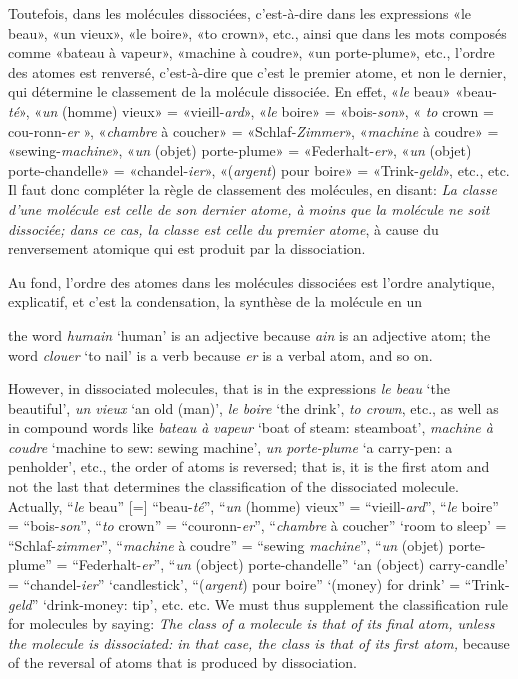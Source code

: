 \begin{sloppypar}
{    Toutefois, dans les molécules dissociées, c'est-à-dire dans les
    expressions «le beau», «un vieux», «le boire», «to crown», etc.,
    ainsi que dans les mots composés comme «bateau à vapeur», «machine
    à coudre», «un porte-plume», etc., l’ordre des atomes est
    renversé, c’est-à-dire que c’est le premier atome, et non le
    dernier, qui détermine le classement de la molécule dissociée. En
    effet, «\emph{le} beau» «beau-\emph{té}», «\emph{un} (homme)
    vieux» = «vieill-\emph{ard}», «\emph{le} boire» =
    «bois-\emph{son}», « \emph{to} crown = cou-ronn-\emph{er} »,
    «\emph{chambre} à coucher» = «Schlaf-\emph{Zimmer}»,
    «\emph{machine} à coudre» = «sewing-\emph{machine}», «\emph{un}
    (objet) porte-plume» = «Federhalt-\emph{er}», «\emph{un} (objet)
    porte-chandelle» = «chandel-\emph{ier}», «(\emph{argent}) pour
    boire» = «Trink-\emph{geld}», etc., etc. Il faut donc compléter la
    règle de classement des molécules, en disant: \emph{La classe
      d'une molécule est celle de son dernier atome, à moins que la
      molécule ne soit dissociée; dans ce cas, la classe est celle du
      premier atome}, à cause du renversement atomique qui est produit
    par la dissociation.

    Au fond, l’ordre des atomes dans les molécules dissociées est
    l’ordre analytique, explicatif, et c’est la condensation, la
    synthèse de la molécule en un}%
  {\noindent the word \emph{humain}
    `human' is an adjective because \emph{ain} is an adjective atom; the
    word \emph{clouer} `to nail' is a verb because \emph{er} is a verbal
    atom, and so on.

    However, in dissociated molecules, that is in the expressions \emph{le
    beau} `the beautiful', \emph{un vieux} `an old (man)', \emph{le boire}
    `the drink', \emph{to crown}, etc., as well as in compound words like
    \emph{bateau à vapeur} `boat of steam: steamboat', \emph{machine à
    coudre} `machine to sew: sewing machine', \emph{un porte-plume} `a
    carry-pen: a penholder', etc., the order of atoms is reversed;
    that is, it is the first atom and not the last that determines the
    classification of the dissociated molecule.  Actually, ``\emph{le}
    beau'' [=] ``beau-\emph{té}'', ``\emph{un} (homme) vieux'' =
    ``vieill-\emph{ard}'', ``\emph{le} boire'' = ``bois-\emph{son}'',
    ``\emph{to} crown'' = ``couronn-\emph{er}'', ``\emph{chambre} à
    coucher'' `room to sleep' = ``Schlaf-\emph{zimmer}'',
    ``\emph{machine} à coudre'' = ``sewing \emph{machine}'',
    ``\emph{un} (objet) porte-plume'' = ``Federhalt-\emph{er}'',
    ``\emph{un} (object) porte-chandelle'' `an (object) carry-candle'
    = ``chandel-\emph{ier}'' `candlestick', ``(\emph{argent}) pour
    boire'' `(money) for drink' = ``Trink-\emph{geld}'' `drink-money:
    tip', etc. etc. We must thus supplement the classification rule
    for molecules by saying: \emph{The class of a molecule is that of
      its final atom, unless the molecule is dissociated: in that
      case, the class is that of its first atom,} because of the
    reversal of atoms that is produced by dissociation.

}
\end{sloppypar}
